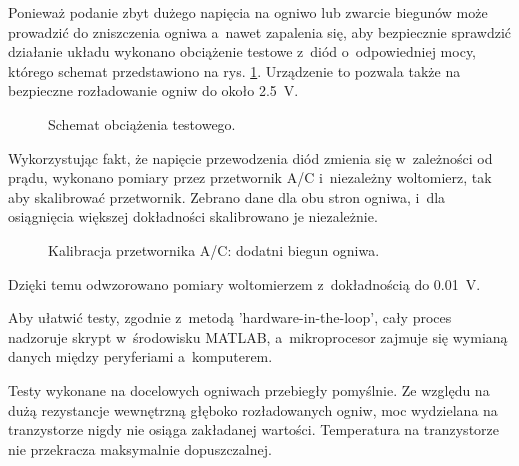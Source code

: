 \documentclass[polish,engineer]{polsl-msth}
\begin{document}
Ponieważ podanie zbyt dużego napięcia na ogniwo lub zwarcie biegunów może prowadzić do zniszczenia ogniwa a~nawet zapalenia się, aby bezpiecznie sprawdzić działanie układu wykonano obciążenie testowe z~diód o~odpowiedniej mocy, którego schemat przedstawiono na rys. \ref{img:testload}. Urządzenie to pozwala także na bezpieczne rozładowanie ogniw do około 2.5~V.
\begin{figure}[hbtp]
    \centering
    \caption{Schemat obciążenia testowego. \label{img:testload}}
\end{figure}

Wykorzystując fakt, że napięcie przewodzenia diód zmienia się w~zależności od prądu, wykonano pomiary przez przetwornik A/C i~niezależny woltomierz, tak aby skalibrować przetwornik. Zebrano dane dla obu stron ogniwa, i~dla osiągnięcia większej dokładności skalibrowano je niezależnie.
\begin{figure}[hbtp]
    
     \caption{Kalibracja przetwornika A/C: dodatni biegun ogniwa. \label{img:ADCfitting}}
\end{figure}
Dzięki temu odwzorowano pomiary woltomierzem z~dokładnością do 0.01~V.

Aby ułatwić testy, zgodnie z~metodą 'hardware-in-the-loop', cały proces nadzoruje skrypt w~środowisku MATLAB, a~mikroprocesor zajmuje się wymianą danych między peryferiami a~komputerem.

Testy wykonane na docelowych ogniwach przebiegły pomyślnie. Ze względu na dużą rezystancje wewnętrzną głęboko rozładowanych ogniw, moc wydzielana na tranzystorze nigdy nie osiąga zakładanej wartości. Temperatura na tranzystorze nie przekracza maksymalnie dopuszczalnej.
\end{document}
